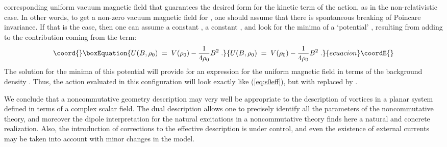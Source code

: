 \documentclass[a4paper,12pt]{article} \tolerance=200
\begin{document}
corresponding uniform vacuum magnetic field that guarantees the
desired form for the kinetic term of the action, as in the
non-relativistic case. In other words, to get a non-zero vacuum
magnetic field for \coordHE{}, one should assume that there is spontaneous
breaking of Poincare invariance.  If that is the case, then one can
assume a constant \coordHE{}, a constant \coordHE{}, and look
for the minima of a `potential' \coordHE{}, resulting from adding to \coordHE{}
the contribution coming from the \coordHE{} term:
\begin{equation}\coord{}\boxEquation{
U(B,\rho_0) \;=\; V(\rho_0) - \frac{1}{4 \rho_0} B^2 \;.
}{
U(B,\rho_0) \;=\; V(\rho_0) - \frac{1}{4 \rho_0} B^2 \;.
}{ecuacion}\coordE{}\end{equation}
The solution for the minima of this potential will provide for an
expression for the uniform magnetic field \coordHE{} in terms of the
background density \coordHE{}. Thus, the action evaluated in this
configuration will look exactly like (\ref{eq:s0eff}), but
 with \coordHE{} replaced by \coordHE{}.
 
 We conclude that a noncommutative geometry description may very well
 be appropriate to the description of vortices in a planar system
 defined in terms of a complex scalar field. The dual description allows one
 to precisely identify all the parameters of the noncommutative
 theory, and moreover the dipole interpretation for the natural
 excitations in a noncommutative theory finds here a natural and
 concrete realization. Also, the introduction of corrections to the
 effective description is under control, and even the existence of
 external currents may be taken into account with minor changes in the
 model.
\end{document}
